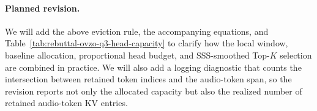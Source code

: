 \begin{answer}
    \paragraph{Planned revision.}
    We will add the above eviction rule, the accompanying equations, and Table~\ref{tab:rebuttal-ovzo-q3-head-capacity} to clarify how the local window, baseline allocation, proportional head budget, and SSS-smoothed Top-$K$ selection are combined in practice.
    We will also add a logging diagnostic that counts the intersection between retained token indices and the audio-token span, so the revision reports not only the allocated capacity but also the realized number of retained audio-token KV entries.
\end{answer}
